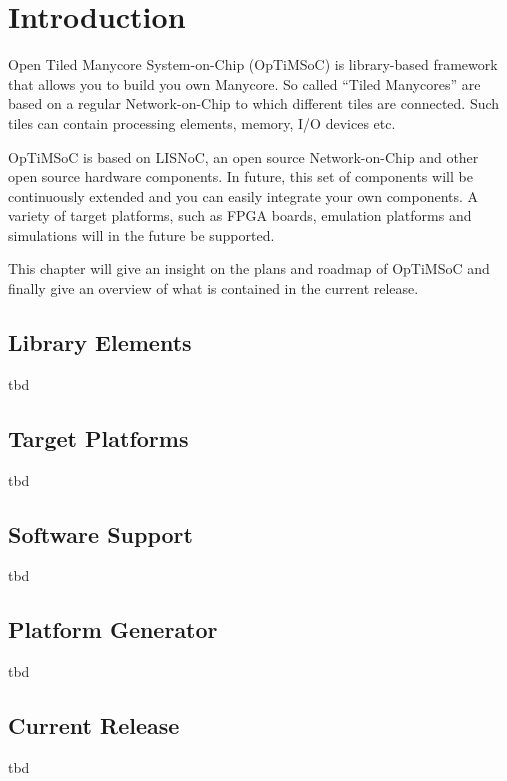 \chapter{Introduction}
\label{chap:introduction}

Open Tiled Manycore System-on-Chip (OpTiMSoC) is library-based
framework that allows you to build you own Manycore. So called ``Tiled
Manycores'' are based on a regular Network-on-Chip to which different
tiles are connected. Such tiles can contain processing elements,
memory, I/O devices etc.

OpTiMSoC is based on LISNoC, an open source Network-on-Chip and other
open source hardware components. In future, this set of components
will be continuously extended and you can easily integrate your own
components. A variety of target platforms, such as FPGA boards,
emulation platforms and simulations will in the future be supported.

This chapter will give an insight on the plans and roadmap of OpTiMSoC
and finally give an overview of what is contained in the current
release.

\section{Library Elements}
tbd

\section{Target Platforms}
tbd

\section{Software Support}
tbd

\section{Platform Generator}
tbd

\section{Current Release}
tbd
